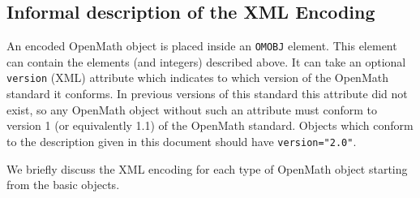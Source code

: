 \documentclass{report}
\def\OM{OpenMath\xspace}
\def\XML{XML\xspace}
\begin{document}
\subsection{Informal description of the \XML Encoding}\label{sec_xml-desc}

An encoded \OM object is placed inside an \lstinline|OMOBJ| element.  This 
element can contain the elements (and integers) described above.
 It can take an optional
\lstinline|version| (\XML) attribute which indicates to
which version of the \OM standard it conforms.  In previous versions of
this standard this attribute did not exist, so any \OM object without
such an attribute must conform to version 1 (or equivalently 1.1) of the
\OM standard.  Objects which conform to the description given in this
document should have \lstinline|version="2.0"|.



We briefly discuss the \XML encoding for each type of \OM object
starting from the basic objects.
\end{document}

